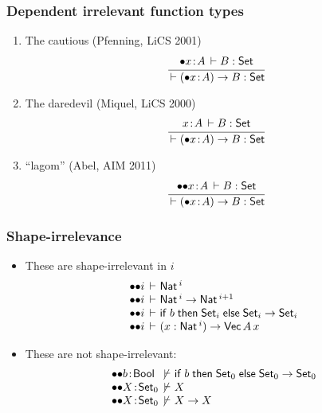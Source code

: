\documentclass[t]{beamer}
\renewcommand{\Set}{\mathsf{Set}}
\newcommand{\cAnn}{\color{red!80!black}}%
\renewcommand{\emph}[1]{{\cAnn#1}}
\newcommand{\irr}{\mathord{\bullet}}
\newcommand{\shirr}{\mathord{{\bullet}{\bullet}}}
\renewcommand{\erhyp}[3][\irr]{#1#2 \of #3}
\newcommand{\shirrhyp}{\erhyp[\shirr]}
\renewcommand{\erfunT}[4][\irr]{(\erhyp[#1]{#2}{#3}) \to #4}
\begin{document}
\begin{frame}%
  \frametitle{Dependent irrelevant function types}
    \begin{enumerate}
    \item The cautious (Pfenning, LiCS 2001)
\[
  \ru{\erhyp x A \der B : \Set
    }{\der \erfunT x A B : \Set}
\]
    \item The daredevil (Miquel, LiCS 2000)
\[
  \ru{x \of A \der B : \Set
    }{\der \erfunT x A B : \Set}
\]
    \item ``lagom'' (Abel, AIM 2011)
\[
  \ru{\shirrhyp x A \der B : \Set
    }{\der \erfunT x A B : \Set}
\]
    \end{enumerate}
\end{frame}

\begin{frame}%
  \frametitle{Shape-irrelevance}
\vspace{-2ex}
  \begin{itemize}
  \item These are shape-irrelevant in $i$
\[
\begin{array}{@{\shirr i \der~}l}
  \Nat^i
\\
  \Nat^i \to \Nat^{i+1}
\\
  \tifthenelse b {\Set_i} {\Set_i \to \Set_i}
\\
  (x : \Nat^i) \to \mathsf{Vec}\,A\,x
\end{array}
\]
  \item These are \emph{not} shape-irrelevant:
\[
\begin{array}{@{\shirr}l@{~\not\der~}l}
  b \of \Bool  & \tifthenelse b {\Set_0} {\Set_0 \to \Set_0}
\\
  X \of \Set_0 & X
\\
  X \of \Set_0 & X \to X
\\
\end{array}
\]
  \end{itemize}
\end{frame}
\end{document}
